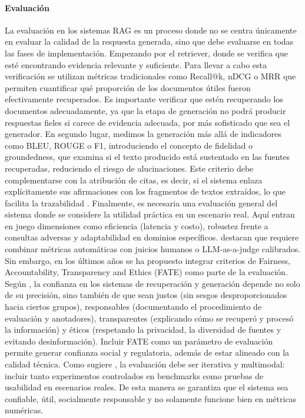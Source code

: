 \paragraph{Evaluación} La evaluación en los sistemas RAG es un proceso donde no se centra únicamente en evaluar la calidad de la respuesta generada, sino que debe evaluarse en todas las fases de implementación. 
Empezando por el retriever, donde se verifica que esté encontrando evidencia relevante y suficiente. Para llevar a cabo esta verificación se utilizan métricas tradicionales como Recall@k, nDCG o MRR que permiten  
cuantificar qué proporción de los documentos útiles fueron efectivamente recuperados. Es importante verificar que estén recuperando los documentos adecuadamente, ya que la etapa de generación no podrá producir respuestas fieles si carece de evidencia adecuada, por más sofisticado que sea el generador.  
En segundo lugar, medimos la generación más allá de indicadores como BLEU, ROUGE o F1, introduciendo el concepto de fidelidad o groundedness, que examina si el texto producido está sustentado en las fuentes recuperadas, reduciendo el riesgo de alucinaciones. 
Este criterio debe complementarse con la atribución de citas, es decir, si el sistema enlaza explícitamente sus afirmaciones con los fragmentos de textos extraídos, lo que facilita la trazabilidad \parencite{zhang2025hallucination}.  
Finalmente, es necesaria una evaluación general del sistema donde se considere la utilidad práctica en un escenario real. Aquí entran en juego dimensiones como eficiencia (latencia y costo), robustez frente a consultas adversas y adaptabilidad en dominios específicos. \textcite{knollmeyer2024benchmarking} destacan que requiere combinar métricas automáticas con juicios humanos o LLM-as-a-judge calibrados.  
Sin embargo, en los últimos años se ha propuesto integrar criterios de Fairness, Accountability, Transparency and Ethics (FATE) como parte de la evaluación. Según \textcite{bernard2025fate}, la confianza en los sistemas de recuperación y generación depende no solo de su precisión, sino también de que sean justos (sin sesgos desproporcionados hacia ciertos grupos), responsables (documentando el procedimiento 
de evaluación y anotadores), transparentes (explicando cómo se recuperó y procesó la información) y éticos (respetando la privacidad, la diversidad de fuentes y evitando desinformación).  
Incluir FATE como un parámetro de evaluación permite generar confianza social y regulatoria, además de estar alineado con la calidad técnica. Como sugiere \textcite{ramdurai2025llm}, la evaluación debe ser iterativa y multimodal: incluir tanto experimentos controlados en benchmarks como pruebas de usabilidad en escenarios reales. De esta manera se garantiza que el sistema sea confiable, útil, socialmente responsable y no solamente funcione bien en métricas numéricas.  

